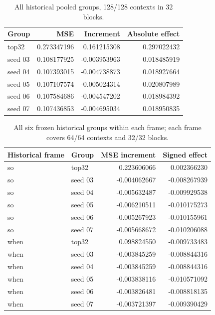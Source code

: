 \begin{table}[ht]\centering\small\begin{tabular}{lrrr}\toprule Group & MSE & Increment & Absolute effect\\\midrule
top32 & 0.273347196 & 0.161215308 & 0.297022432\\
seed 03 & 0.108177925 & -0.003953963 & 0.018485919\\
seed 04 & 0.107393015 & -0.004738873 & 0.018927664\\
seed 05 & 0.107107574 & -0.005024314 & 0.020807989\\
seed 06 & 0.107584686 & -0.004547202 & 0.018984392\\
seed 07 & 0.107436853 & -0.004695034 & 0.018950835\\
\bottomrule\end{tabular}\caption{All historical pooled groups, 128/128 contexts in 32 blocks.}\end{table}
\begin{table}[ht]\centering\small\begin{tabular}{llrr}\toprule Historical frame & Group & MSE increment & Signed effect\\\midrule
so & top32 & 0.223606066 & 0.002366230\\
so & seed 03 & -0.004062667 & -0.008267939\\
so & seed 04 & -0.005632487 & -0.009929538\\
so & seed 05 & -0.006210511 & -0.010175273\\
so & seed 06 & -0.005267923 & -0.010155961\\
so & seed 07 & -0.005668672 & -0.010206088\\
when & top32 & 0.098824550 & -0.009733483\\
when & seed 03 & -0.003845259 & -0.008844316\\
when & seed 04 & -0.003845259 & -0.008844316\\
when & seed 05 & -0.003838116 & -0.010571092\\
when & seed 06 & -0.003826481 & -0.008818135\\
when & seed 07 & -0.003721397 & -0.009390429\\
\bottomrule\end{tabular}\caption{All six frozen historical groups within each frame; each frame covers 64/64 contexts and 32/32 blocks.}\end{table}